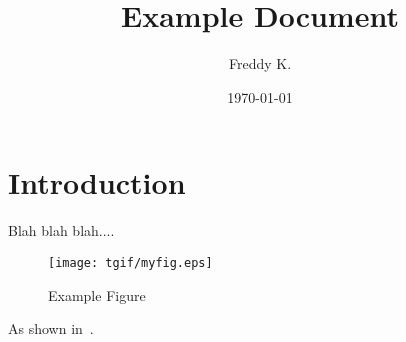 \documentclass[11pt]{article}
\title{Example Document}
\author{Freddy K.}
\date{\today}
\begin{document}
\maketitle
\section{Introduction}
Blah blah blah....

\begin{figure}[ht]
\centering
\texttt{[image: tgif/myfig.eps]}
\caption{Example Figure}
\label{fig:myfig}
\end{figure}

As shown in~\cite{en300.175-2v1.4.2}.


\end{document}

